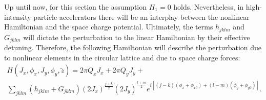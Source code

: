  Up until now, for this section the assumption $H_1=0$ holds. Nevertheless, in high-intensity particle accelerators there will be an interplay between the nonlinear Hamiltonian and the space charge potential. Ultimately, the terms $h_{jklm}$ and $G_{jklm}$ will dictate the perturbation to the linear Hamiltonian by their effective detuning. Therefore, the following Hamiltonian will describe the perturbation due to nonlinear elements in the circular lattice and due to space charge forces:
 \begin{multline}
    \label{eq:hfinal}
    H(J_x,\phi_x,J_y, \phi_y,\tilde{z})= 2\pi Q_x J_x + 2\pi Q_y J_y + \\
    \sum_{jklm} \left( h_{jklm}+G_{jklm} \right) \left( 2 J_x\right)^{\frac{j+k}{2}} \left( 2 J_y\right)^{\frac{l+m}{2}} e^{i\left[ \left( j-k \right)\left( \phi_x+\phi_{x0} \right)+ \left( l-m \right) \left( \phi_y+\phi_{y0} \right)\right]}.
\end{multline}